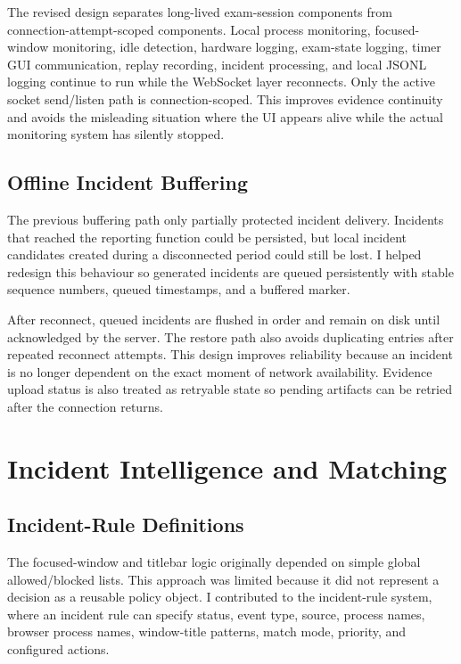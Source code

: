 \documentclass[conference]{IEEEtran}
\begin{document}
The revised design separates long-lived exam-session components from connection-attempt-scoped components. Local process monitoring, focused-window monitoring, idle detection, hardware logging, exam-state logging, timer GUI communication, replay recording, incident processing, and local JSONL logging continue to run while the WebSocket layer reconnects. Only the active socket send/listen path is connection-scoped. This improves evidence continuity and avoids the misleading situation where the UI appears alive while the actual monitoring system has silently stopped.

\subsection{Offline Incident Buffering}

The previous buffering path only partially protected incident delivery. Incidents that reached the reporting function could be persisted, but local incident candidates created during a disconnected period could still be lost. I helped redesign this behaviour so generated incidents are queued persistently with stable sequence numbers, queued timestamps, and a buffered marker.

After reconnect, queued incidents are flushed in order and remain on disk until acknowledged by the server. The restore path also avoids duplicating entries after repeated reconnect attempts. This design improves reliability because an incident is no longer dependent on the exact moment of network availability. Evidence upload status is also treated as retryable state so pending artifacts can be retried after the connection returns.

\section{Incident Intelligence and Matching}

\subsection{Incident-Rule Definitions}

The focused-window and titlebar logic originally depended on simple global allowed/blocked lists. This approach was limited because it did not represent a decision as a reusable policy object. I contributed to the incident-rule system, where an incident rule can specify status, event type, source, process names, browser process names, window-title patterns, match mode, priority, and configured actions.
\end{document}
